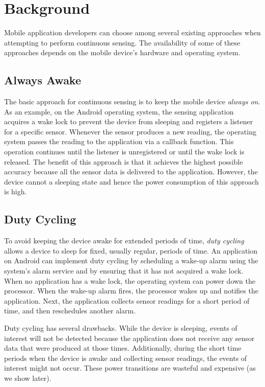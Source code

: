 
\section{Background}
\label{sec:background}

Mobile application developers can choose among several existing approaches when
attempting to perform continuous sensing. The availability of some of these
approaches depends on the mobile device's hardware and operating system.

\subsection{Always Awake}

The basic approach for continuous sensing is to keep the mobile device
\emph{always on}. As an example, on the Android operating system, the sensing
application acquires a wake lock to prevent the device from sleeping and
registers a listener for a specific sensor. Whenever the sensor produces a new
reading, the operating system passes the reading to the application via a
callback function. This operation continues until the listener is unregistered
or until the wake lock is released. The benefit of this approach is that it
achieves the highest possible accuracy because all the sensor data is delivered to the
application. However, the device cannot a sleeping state and hence the power
consumption of this approach is high.

\subsection{Duty Cycling}

To avoid keeping the device awake for extended periods of time, \emph{duty 
cycling} allows a device to sleep for fixed, usually regular, periods of
time. An application on Android can implement duty cycling by scheduling a wake-up alarm using the system's alarm service and by ensuring that it has not
acquired a wake lock. When no application has a wake lock, the operating system
can power down the processor. When the wake-up alarm fires, the processor wakes up and notifies the application. Next, the application collects sensor readings
for a short period of time, and then reschedules another alarm.

Duty cycling has several drawbacks. While the device is sleeping, events of interest will not be 
detected because the application does not receive any sensor data that were produced at those 
times. Additionally, during the short time periods when the device is awake and collecting 
sensor readings, the events of interest might not occur. These power transitions are wasteful 
and expensive (as we show later). 

